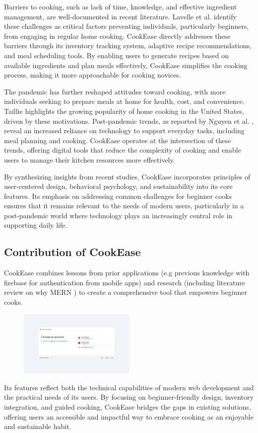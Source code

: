 \documentclass[10pt,twocolumn]{article}
\begin{document}
Barriers to cooking, such as lack of time, knowledge, and effective ingredient management, are well-documented in recent literature. Lavelle et al. \cite{Lavelle2016} identify these challenges as critical factors preventing individuals, particularly beginners, from engaging in regular home cooking. CookEase directly addresses these barriers through its inventory tracking system, adaptive recipe recommendations, and meal scheduling tools. By enabling users to generate recipes based on available ingredients and plan meals effectively, CookEase simplifies the cooking process, making it more approachable for cooking novices.

The pandemic has further reshaped attitudes toward cooking, with more individuals seeking to prepare meals at home for health, cost, and convenience. Taillie \cite{Taillie2018} highlights the growing popularity of home cooking in the United States, driven by these motivations. Post-pandemic trends, as reported by Nguyen et al. \cite{Nguyen2020}, reveal an increased reliance on technology to support everyday tasks, including meal planning and cooking. CookEase operates at the intersection of these trends, offering digital tools that reduce the complexity of cooking and enable users to manage their kitchen resources more effectively.

By synthesizing insights from recent studies, CookEase incorporates principles of user-centered design, behavioral psychology, and sustainability into its core features. Its emphasis on addressing common challenges for beginner cooks ensures that it remains relevant to the needs of modern users, particularly in a post-pandemic world where technology plays an increasingly central role in supporting daily life.

\subsection{Contribution of CookEase}
CookEase combines lessons from prior applications (e.g previous knowledge with firebase for authentication from mobile apps) and research (including literature review on why MERN \cite{Bafna2022} \cite{IJCRT2023}) to create a comprehensive tool that empowers beginner cooks. 
\begin{figure}[h!]
\includegraphics[width=0.5\textwidth]{images/GoogleSignIn.png}
\centering
\end{figure} 
Its features reflect both the technical capabilities of modern web development and the practical needs of its users. By focusing on beginner-friendly design, inventory integration, and guided cooking, CookEase bridges the gaps in existing solutions, offering users an accessible and impactful way to embrace cooking as an enjoyable and sustainable habit.
\end{document}
